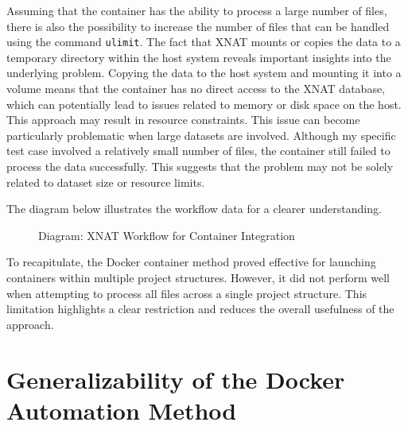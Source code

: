 Assuming that the container has the ability to process a large number of files, there is also the possibility to increase the number of files that can be handled using the command \texttt{ulimit}.  
The fact that XNAT mounts or copies the data to a temporary directory within the host system reveals important insights into the underlying problem. Copying the data to the host system and mounting it into a volume means that the container has no direct access to the XNAT database, which can potentially lead to issues related to memory or disk space on the host. This approach may result in resource constraints.  
This issue can become particularly problematic when large datasets are involved. Although my specific test case involved a relatively small number of files, the container still failed to process the data successfully. This suggests that the problem may not be solely related to dataset size or resource limits.

The diagram below illustrates the workflow data for a clearer understanding.  

\begin{figure}[ht]
    \centering
    \def\svgwidth{\linewidth} 
    
    \caption{Diagram: XNAT Workflow for Container Integration}
    \label{fig:workflowxnat}
\end{figure}


To recapitulate, the Docker container method proved effective for launching containers within multiple project structures. However, it did not perform well when attempting to process all files across a single project structure. This limitation highlights a clear restriction and reduces the overall usefulness of the approach.

\section{Generalizability of the Docker Automation Method}





